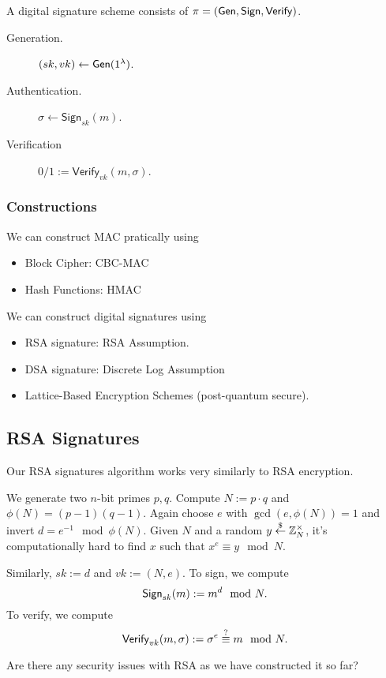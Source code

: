 A digital signature scheme consists of $\pi = (\operatorname{\mathsf{Gen}}, \mathsf{Sign}, \mathsf{Verify})$.
\begin{description}
    \item[Generation.] $(sk, vk)\leftarrow \operatorname{\mathsf{Gen}}(1^\lambda)$.
    \item[Authentication.] $\sigma \leftarrow \mathsf{Sign}_{sk}(m)$.
    \item[Verification] $0/1 := \mathsf{Verify}_{vk}(m, \sigma)$.
\end{description}

\subsubsection{Constructions}
We can construct MAC pratically using
\begin{itemize}
    \item Block Cipher: CBC-MAC
    \item Hash Functions: HMAC
\end{itemize}

We can construct digital signatures using
\begin{itemize}
    \item RSA signature: RSA Assumption.
    \item DSA signature: Discrete Log Assumption
    \item Lattice-Based Encryption Schemes (post-quantum secure).
\end{itemize}

\subsection{RSA Signatures}
Our RSA signatures algorithm works very similarly to RSA encryption.

We generate two $n$-bit primes $p, q$. Compute $N:=p\cdot q$ and $\phi(N) = (p-1)(q-1)$. Again choose $e$ with $\gcd(e, \phi(N)) = 1$ and invert $d = e^{-1}\mod\phi(N)$. Given $N$ and a random $y\overset{\$}{\leftarrow}\mathbb Z_N^\times$, it's computationally hard to find $x$ such that $x^e\equiv y\mod N$.

Similarly, $sk := d$ and $vk := (N, e)$. To sign, we compute
\[\operatorname{\mathsf{Sign}}_{sk}(m) := m^d\mod{N}.\]
To verify, we compute
\[\operatorname{\mathsf{Verify}}_{vk}(m, \sigma):= \sigma^e\overset{?}{\equiv}m\mod N.\]

\begin{ques*}
    Are there any security issues with RSA as we have constructed it so far?
\end{ques*}

